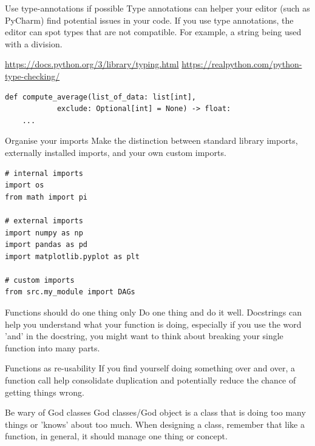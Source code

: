 \documentclass[10pt]{beamer}
\begin{document}
\begin{frame}[label={sec:org9920ecd},fragile]{Use type-annotations if possible}
 Type annotations can helper your editor (such as PyCharm) find potential issues in
your code. If you use type annotations, the editor can spot types that are not
compatible. For example, a string being used with a division.

\url{https://docs.python.org/3/library/typing.html}
\url{https://realpython.com/python-type-checking/}

\begin{verbatim}
def compute_average(list_of_data: list[int],
		    exclude: Optional[int] = None) -> float:
    ...
\end{verbatim}
\end{frame}

\begin{frame}[label={sec:org803886b},fragile]{Organise your imports}
 Make the distinction between standard library imports, externally installed imports,
and your own custom imports.

\begin{verbatim}
# internal imports
import os
from math import pi

# external imports
import numpy as np
import pandas as pd
import matplotlib.pyplot as plt

# custom imports
from src.my_module import DAGs
\end{verbatim}
\end{frame}

\begin{frame}[label={sec:orgf54092b}]{Functions should do one thing only}
Do one thing and do it well. Docstrings can help you understand what your function is
doing, especially if you use the word 'and' in the docstring, you might want to think
about breaking your single function into many parts.
\end{frame}

\begin{frame}[label={sec:org55bc4a3}]{Functions as re-usability}
If you find yourself doing something over and over, a function call help consolidate
duplication and potentially reduce the chance of getting things wrong.
\end{frame}

\begin{frame}[label={sec:org7863a3f}]{Be wary of God classes}
God classes/God object is a class that is doing too many things or 'knows' about too
much. When designing a class, remember that like a function, in general, it should
manage one thing or concept.
\end{frame}
\end{document}
